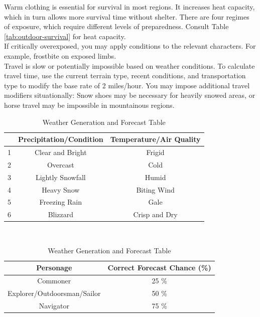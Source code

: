 \documentclass[notitlepage]{article}
\begin{document}
\begin{multicols}{2}
Warm clothing is essential for survival in most regions.
It increases heat capacity, which in turn allows more survival time without shelter.
There are four regimes of exposure, which require different levels of preparedness.
Consult Table \ref{tab:outdoor-survival} for heat capacity. \\

If critically overexposed, you may apply conditions to the relevant characters.
For example, frostbite on exposed limbs. \\

Travel is slow or potentially impossible based on weather conditions.
To calculate travel time, use the current terrain type, recent conditions, and transportation type to modify the base rate of 2 miles/hour.
You may impose additional travel modifiers situationally: Snow shoes may be necessary for heavily snowed areas, or horse travel may be impossible in mountainous regions.

\end{multicols}



\begin{table}[hb]
  \centering \large
  \begin{tabular}{| c || c || c ||}
    \hline
    & Precipitation/Condition & Temperature/Air Quality \\ \hline
    1 & Clear and Bright & Frigid \\
    2 & Overcast & Cold \\
    3 & Lightly Snowfall & Humid \\
    4 & Heavy Snow & Biting Wind \\
    5 & Freezing Rain & Gale \\
    6 & Blizzard & Crisp and Dry  \\ \hline
  \end{tabular} \\

  \begin{tabular}{|c||c|}
    \hline Personage & Correct Forecast Chance (\%) \\ \hline
    Commoner  & 25 \% \\
    Explorer/Outdoorsman/Sailor & 50 \% \\
    Navigator & 75 \% \\ \hline
  \end{tabular}
  \caption{Weather Generation and Forecast Table}
  \label{tbl:weather}  
\end{table}  
\end{document}
